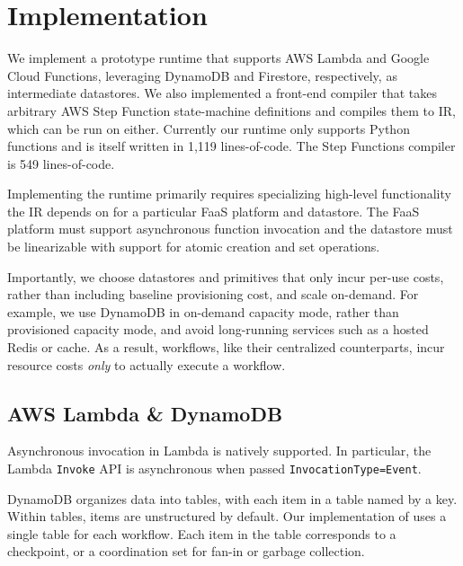 \section{Implementation}\label{sec:impl}

We implement a prototype \name{} runtime that supports AWS Lambda and Google
Cloud Functions, leveraging DynamoDB and Firestore, respectively, as
intermediate datastores. We also implemented a front-end compiler that takes
arbitrary AWS Step Function state-machine definitions and compiles them to
\name{} IR, which can be run on either. Currently our runtime only supports
Python functions and is itself written in 1,119 lines-of-code. The Step
Functions compiler is 549 lines-of-code.

Implementing the runtime primarily requires specializing high-level
functionality the IR depends on for a particular FaaS platform and datastore.
The FaaS platform must support asynchronous function invocation and the
datastore must be linearizable with support for atomic creation and set
operations.

Importantly, we choose datastores and primitives that only incur per-use costs,
rather than including baseline provisioning cost, and scale on-demand. For
example, we use DynamoDB in on-demand capacity mode, rather than provisioned
capacity mode, and avoid long-running services such as a hosted Redis or cache.
As a result, \name{} workflows, like their centralized counterparts, incur
resource costs \emph{only} to actually execute a workflow.

\subsection{AWS Lambda \& DynamoDB}

Asynchronous invocation in Lambda is natively supported. In particular, the
Lambda \texttt{Invoke} API is asynchronous when passed
\texttt{InvocationType=Event}. 

DynamoDB organizes data into tables, with each item in a table named by a key.
Within tables, items are unstructured by default. Our implementation of
\name{} uses a single table for each workflow. Each item in the table
corresponds to a checkpoint, or a coordination set for fan-in or garbage
collection.

